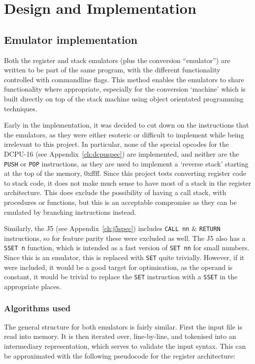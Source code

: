 \chapter{Design and Implementation}\label{ch:designimplementation}

\section{Emulator implementation}
Both the register and stack emulators (plus the conversion ``emulator'') are
written to be part of the same program, with the different functionality
controlled with commandline flags. This method enables the emulators to share
functionality where appropriate, especially for the conversion `machine' which
is built directly on top of the stack machine using object orientated
programming techniques.

Early in the implementation, it was decided to cut down on the instructions that
the emulators, as they were either esoteric or difficult to implement while
being irrelevant to this project. In particular, none of the special opcodes for
the DCPU-16 (see Appendix~\ref{ch:dcpuspec}) are implemented, and neither are
the \texttt{PUSH} or \texttt{POP} instructions, as they are used to implement a
`reverse stack' starting at the top of the memory, 0xffff. Since this project
tests converting register code to stack code, it does not make much sense to
have most of a stack in the register architecture. This does exclude the
possibility of having a call stack, with procedures or functions, but this is an
acceptable compromise as they can be emulated by branching instructions instead.

Similarly, the J5 (see Appendix~\ref{ch:j5spec}) includes \texttt{CALL nn} \&
\texttt{RETURN} instructions, so for feature parity these were excluded as well.
The J5 also has a \texttt{SSET n} function, which is intended as a fast version
of \texttt{SET nn} for small numbers. Since this is an emulator, this is
replaced with \texttt{SET} quite trivially. However, if it were included, it
would be a good target for optimisation, as the operand is constant, it would be
trivial to replace the \texttt{SET} instruction with a \texttt{SSET} in the
appropriate places.

\subsection{Algorithms used}
The general structure for both emulators is fairly similar. First the input
file is read into memory. It is then iterated over, line-by-line, and tokenised
into an intermediary representation, which serves to validate the input syntax.
This can be approximated with the following pseudocode for the register
architecture:

